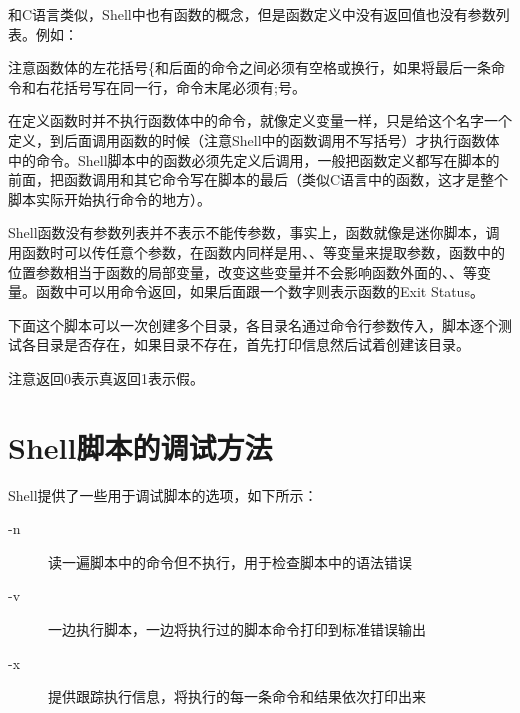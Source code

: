 和C语言类似，Shell中也有函数的概念，但是函数定义中没有返回值也没有参数列表。例如：




注意函数体的左花括号\{和后面的命令之间必须有空格或换行，如果将最后一条命令和右花括号\BookCode{\}}写在同一行，命令末尾必须有;号。



在定义函数时并不执行函数体中的命令，就像定义变量一样，只是给这个名字一个定义，到后面调用函数的时候（注意Shell中的函数调用不写括号）才执行函数体中的命令。Shell脚本中的函数必须先定义后调用，一般把函数定义都写在脚本的前面，把函数调用和其它命令写在脚本的最后（类似C语言中的函数，这才是整个脚本实际开始执行命令的地方）。



Shell函数没有参数列表并不表示不能传参数，事实上，函数就像是迷你脚本，调用函数时可以传任意个参数，在函数内同样是用、、等变量来提取参数，函数中的位置参数相当于函数的局部变量，改变这些变量并不会影响函数外面的、、等变量。函数中可以用命令返回，如果后面跟一个数字则表示函数的Exit Status。



下面这个脚本可以一次创建多个目录，各目录名通过命令行参数传入，脚本逐个测试各目录是否存在，如果目录不存在，首先打印信息然后试着创建该目录。




注意返回0表示真返回1表示假。




\section{Shell脚本的调试方法}
%
Shell提供了一些用于调试脚本的选项，如下所示：


\begin{description}
\item[{-n}]


读一遍脚本中的命令但不执行，用于检查脚本中的语法错误

\item[{-v}]


一边执行脚本，一边将执行过的脚本命令打印到标准错误输出

\item[{-x}]


提供跟踪执行信息，将执行的每一条命令和结果依次打印出来


\end{description}


